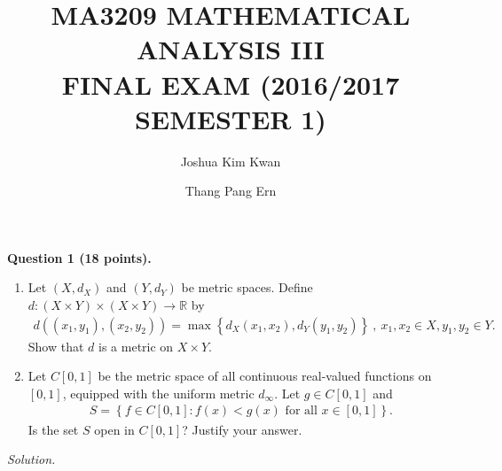 \documentclass[11pt]{amsart}
\title {MA3209 MATHEMATICAL ANALYSIS III\\ FINAL EXAM (2016/2017 SEMESTER 1)}
\author{Joshua Kim Kwan}
\author{Thang Pang Ern}
\theoremstyle{plain}
\numberwithin{equation}{section}
\begin{document}
\maketitle
\noindent \textbf{Question 1 (18 points).} 
\begin{enumerate}[label=\textbf{(\alph*)}]
    \itemsep 0em
    \item Let $\left(X,d_{X}\right)$ and $\left(Y,d_{Y}\right)$ be metric spaces. Define $d:(X\times Y)\times (X\times Y)\longrightarrow\mathbb{R}$ by 
\begin{align*}
    d\left(\left(x_{1},y_{1}\right),\left(x_{2},y_{2}\right)\right)=\max\left\{d_{X}\left(x_{1},x_{2}\right),d_{Y}\left(y_{1},y_{2}\right)\right\}~,~x_{1},x_{2}\in X,y_{1},y_{2}\in Y.
\end{align*}
Show that $d$ is a metric on $X\times Y$.
\item Let $C[0,1]$ be the metric space of all continuous real-valued functions on $[0,1]$, equipped with the uniform metric $d_{\infty}$. Let $g\in C[0,1]$ and
\begin{align*}
    S=\left\{f\in C[0,1]:f(x)<g(x)\text{ for all }x\in[0,1]\right\}.
\end{align*}
Is the set $S$ open in $C[0,1]$? Justify your answer.
\end{enumerate}
\noindent\emph{Solution.}
\end{document}
